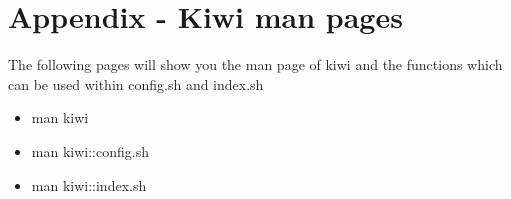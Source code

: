 \chapter{Appendix - Kiwi man pages}
\label{chapter:Appendix}
\minitoc

The following pages will show you the man page of kiwi and the
functions which can be used within config.sh and index.sh

\begin{itemize}
  \item{man kiwi}
  \item{man kiwi::config.sh}
  \item{man kiwi::index.sh}
\end{itemize}

